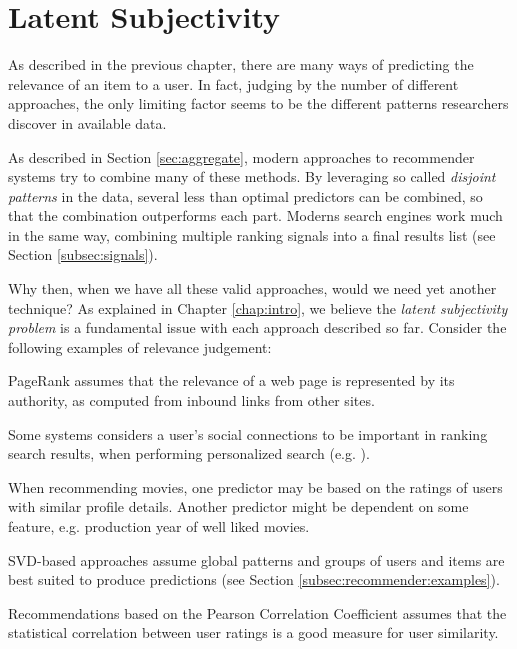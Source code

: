 \section{Latent Subjectivity}
\label{sec:reasoning}

As described in the previous chapter, 
there are many ways of predicting the
relevance of an item to a user. 
In fact, judging by the number of different approaches,
the only limiting factor seems to be the different 
patterns researchers discover in available data.

As described in Section \ref{sec:aggregate},
modern approaches to recommender systems try to combine many of these methods.
By leveraging so called \emph{disjoint patterns}
in the data, several less than optimal predictors
can be combined, so that the combination outperforms each part.
Moderns search engines work much in the same way,
combining multiple ranking signals into a final results list
(see Section \ref{subsec:signals}).

Why then, when we have all these valid approaches, would we need yet another technique?
As explained in Chapter \ref{chap:intro}, 
we believe the \emph{latent subjectivity problem}
is a fundamental issue with each approach described so far.
Consider the following examples of relevance judgement:

\begin{itemize*}
  \item PageRank \citep{Bender2005} assumes that the relevance of a web page is 
  represented by its authority, as computed from inbound links from other sites.
  \item Some systems considers a user's social connections to be important
  in ranking search results, when performing personalized search (e.g. \cite{Carmel2009}).
  \item When recommending movies, one predictor may be based on the ratings
  of users with similar profile details. Another predictor might be 
  dependent on some feature, e.g. production year of well liked movies.
  \item SVD-based approaches assume global patterns and groups of users and items
  are best suited to produce predictions (see Section \ref{subsec:recommender:examples}).
  \item Recommendations based on the Pearson Correlation Coefficient \cite[p11]{Segaran2007}
  assumes that the statistical correlation between user ratings is a good
  measure for user similarity.
\end{itemize*}

